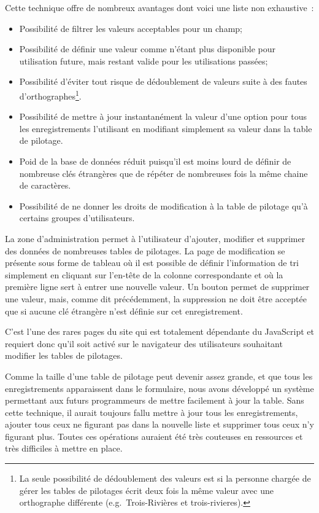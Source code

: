 \documentclass[letter, 11pt]{report}
\begin{document}
Cette technique offre de nombreux avantages dont voici une liste non exhaustive~:
\begin{itemize}
	\item Possibilité de filtrer les valeurs acceptables pour un champ;
	\item Possibilité de définir une valeur comme n'étant plus disponible pour utilisation future, mais restant valide pour les utilisations passées;
	\item Possibilité d'éviter tout risque de dédoublement de valeurs suite à des fautes d'orthographes\footnote{La seule possibilité de dédoublement des valeurs est si la personne chargée de gérer les tables de pilotages écrit deux fois la même valeur avec une orthographe différente (e.g.\ Trois-Rivières et trois-rivieres).}.
	\item Possibilité de mettre à jour instantanément la valeur d'une option pour tous les enregistrements l'utilisant en modifiant simplement sa valeur dans la table de pilotage.
	\item Poid de la base de données réduit puisqu'il est moins lourd de définir de nombreuse clés étrangères que de répéter de nombreuses fois la même chaine de caractères.
	\item Possibilité de ne donner les droits de modification à la table de pilotage qu'à certains groupes d'utilisateurs.
\end{itemize}

La zone d'administration permet à l'utilisateur d'ajouter, modifier et supprimer des données de nombreuses tables de pilotages. La page de modification se présente sous forme de tableau où il est possible de définir l'information de tri simplement en cliquant sur l'en-tête de la colonne correspondante et où la première ligne sert à entrer une nouvelle valeur. Un bouton permet de supprimer une valeur, mais, comme dit précédemment, la suppression ne doit être acceptée que si aucune clé étrangère n'est définie sur cet enregistrement.

C'est l'une des rares pages du site qui est totalement dépendante du JavaScript et requiert donc qu'il soit activé sur le navigateur des utilisateurs souhaitant modifier les tables de pilotages.

Comme la taille d'une table de pilotage peut devenir assez grande, et que tous les enregistrements apparaissent dans le formulaire, nous avons développé un système permettant aux futurs programmeurs de mettre facilement à jour la table. Sans cette technique, il aurait toujours fallu mettre à jour tous les enregistrements, ajouter tous ceux ne figurant pas dans la nouvelle liste et supprimer tous ceux n'y figurant plus. Toutes ces opérations auraient été très couteuses en ressources et très difficiles à mettre en place.
\end{document}
